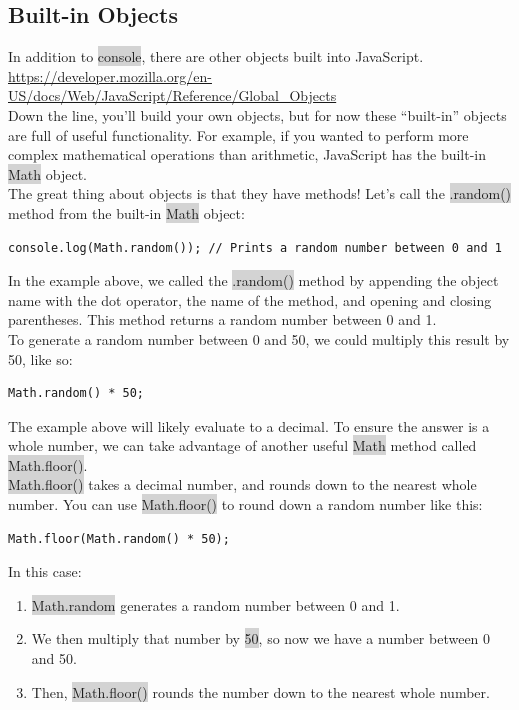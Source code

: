 \documentclass[11pt]{article}
\begin{document}
\subsection{Built-in Objects}
In addition to \colorbox{lightgray}{console}, there are other objects built into JavaScript. \\
\underline{https://developer.mozilla.org/en-US/docs/Web/JavaScript/Reference/Global\_Objects} \\
Down the line, you’ll build your own objects, but for now these “built-in” objects are full of useful functionality.
For example, if you wanted to perform more complex mathematical operations than arithmetic, JavaScript has the built-in \colorbox{lightgray}{Math} object. \\
\newline
The great thing about objects is that they have methods! Let’s call the \colorbox{lightgray}{.random()} method from the built-in \colorbox{lightgray}{Math} object:
\begin{lstlisting}
console.log(Math.random()); // Prints a random number between 0 and 1
\end{lstlisting}
In the example above, we called the \colorbox{lightgray}{.random()} method by appending the object name with the dot operator, the name of the method, and opening and closing parentheses. This method returns a random number between 0 and 1. \\
\newline
To generate a random number between 0 and 50, we could multiply this result by 50, like so:
\begin{lstlisting}
Math.random() * 50;
\end{lstlisting}
The example above will likely evaluate to a decimal. To ensure the answer is a whole number, we can take advantage of another useful \colorbox{lightgray}{Math} method called \colorbox{lightgray}{Math.floor()}. \\
\newline
\colorbox{lightgray}{Math.floor()} takes a decimal number, and rounds down to the nearest whole number. You can use \colorbox{lightgray}{Math.floor()} to round down a random number like this:
\begin{lstlisting}
Math.floor(Math.random() * 50);
\end{lstlisting}
In this case: 
\begin{enumerate}[leftmargin = *]
\item \colorbox{lightgray}{Math.random} generates a random number between 0 and 1.
\item We then multiply that number by \colorbox{lightgray}{50}, so now we have a number between 0 and 50.
\item Then, \colorbox{lightgray}{Math.floor()} rounds the number down to the nearest whole number.
\end{enumerate}
\end{document}
